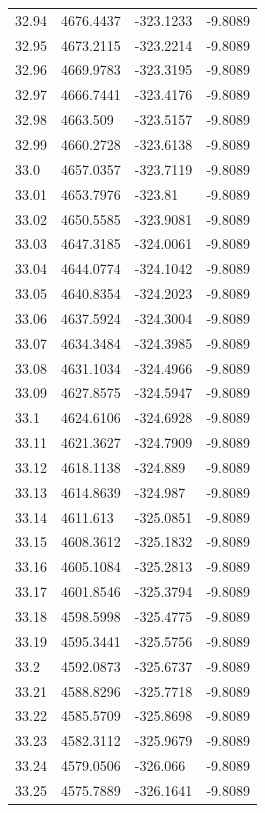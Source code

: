 \begin{table}[H]
\begin{tabular}{llll}
32.94 & 4676.4437 & -323.1233 & -9.8089 \\
32.95 & 4673.2115 & -323.2214 & -9.8089 \\
32.96 & 4669.9783 & -323.3195 & -9.8089 \\
32.97 & 4666.7441 & -323.4176 & -9.8089 \\
32.98 & 4663.509 & -323.5157 & -9.8089 \\
32.99 & 4660.2728 & -323.6138 & -9.8089 \\
33.0 & 4657.0357 & -323.7119 & -9.8089 \\
33.01 & 4653.7976 & -323.81 & -9.8089 \\
33.02 & 4650.5585 & -323.9081 & -9.8089 \\
33.03 & 4647.3185 & -324.0061 & -9.8089 \\
33.04 & 4644.0774 & -324.1042 & -9.8089 \\
33.05 & 4640.8354 & -324.2023 & -9.8089 \\
33.06 & 4637.5924 & -324.3004 & -9.8089 \\
33.07 & 4634.3484 & -324.3985 & -9.8089 \\
33.08 & 4631.1034 & -324.4966 & -9.8089 \\
33.09 & 4627.8575 & -324.5947 & -9.8089 \\
33.1 & 4624.6106 & -324.6928 & -9.8089 \\
33.11 & 4621.3627 & -324.7909 & -9.8089 \\
33.12 & 4618.1138 & -324.889 & -9.8089 \\
33.13 & 4614.8639 & -324.987 & -9.8089 \\
33.14 & 4611.613 & -325.0851 & -9.8089 \\
33.15 & 4608.3612 & -325.1832 & -9.8089 \\
33.16 & 4605.1084 & -325.2813 & -9.8089 \\
33.17 & 4601.8546 & -325.3794 & -9.8089 \\
33.18 & 4598.5998 & -325.4775 & -9.8089 \\
33.19 & 4595.3441 & -325.5756 & -9.8089 \\
33.2 & 4592.0873 & -325.6737 & -9.8089 \\
33.21 & 4588.8296 & -325.7718 & -9.8089 \\
33.22 & 4585.5709 & -325.8698 & -9.8089 \\
33.23 & 4582.3112 & -325.9679 & -9.8089 \\
33.24 & 4579.0506 & -326.066 & -9.8089 \\
33.25 & 4575.7889 & -326.1641 & -9.8089 \\

\end{tabular}
\end{table}
